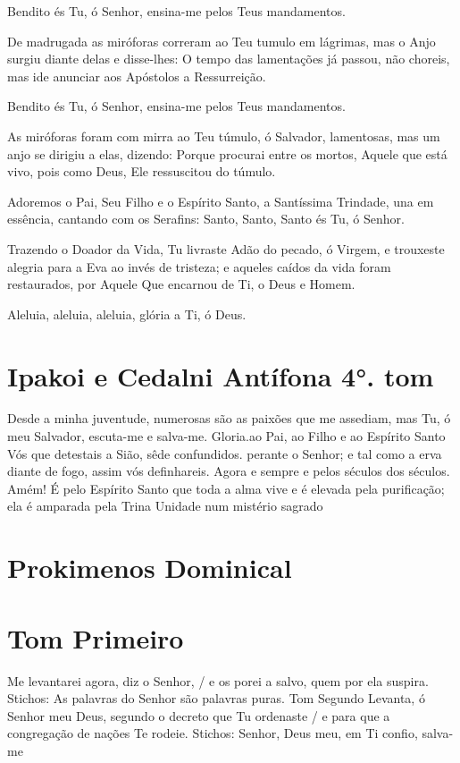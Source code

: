 \documentclass{subfiles}
\begin{document}
Bendito és Tu, ó Senhor, ensina-me pelos Teus mandamentos.

De madrugada as miróforas correram ao Teu tumulo em lágrimas, mas
o Anjo surgiu diante delas e disse-lhes: O tempo das lamentações já passou,
não choreis, mas ide anunciar aos Apóstolos a Ressurreição.

Bendito és Tu, ó Senhor, ensina-me pelos Teus mandamentos.

As miróforas foram com mirra ao Teu túmulo, ó Salvador, lamentosas, mas um
anjo se dirigiu a elas, dizendo: Porque procurai entre os mortos, Aquele que
está vivo, pois como Deus, Ele ressuscitou do túmulo.

\doxology{}

Adoremos o Pai, Seu Filho e o Espírito Santo, a Santíssima Trindade,
una em essência, cantando com os Serafins: Santo, Santo, Santo és Tu, ó
Senhor.

\nowandever{}

Trazendo o Doador da Vida, Tu livraste Adão do pecado, ó Virgem, e trouxeste
alegria para a Eva ao invés de tristeza; e aqueles caídos da vida foram
restaurados, por Aquele Que encarnou de Ti, o Deus e Homem.

Aleluia, aleluia, aleluia, glória a Ti, ó Deus. \thrice{}

\section*{Ipakoi e Cedalni Antífona 4°. tom}

Desde a minha juventude, numerosas são as paixões que me assediam,
mas Tu, ó meu Salvador, escuta-me e salva-me.
Gloria.ao Pai, ao Filho e ao Espírito Santo
Vós que detestais a Sião, sêde confundidos. perante o Senhor; e tal
como a erva diante de fogo, assim vós definhareis.
Agora e sempre e pelos séculos dos séculos. Amém!
É pelo Espírito Santo que toda a alma vive e é elevada pela purificação;
ela é amparada pela Trina Unidade num mistério sagrado

\section*{Prokimenos Dominical}

\section*{Tom Primeiro}

Me levantarei agora, diz o Senhor, / e os porei a salvo, quem por ela
suspira.
Stichos: As palavras do Senhor são palavras puras.
Tom Segundo
Levanta, ó Senhor meu Deus, segundo o decreto que Tu ordenaste / e
para que a congregação de nações Te rodeie.
Stichos: Senhor, Deus meu, em Ti confio, salva-me
\end{document}
